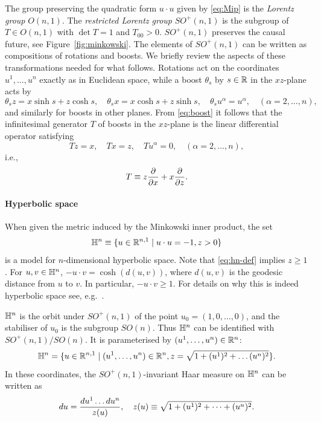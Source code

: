 \documentclass[11pt,a4paper]{article}
\begin{document}
The group preserving the quadratic form $u\cdot u$ given by
\eqref{eq:Mip} is the \emph{Lorentz group} $O(n,1)$.  The
\emph{restricted Lorentz group} $SO^+(n,1)$ is the subgroup of
$T \in O(n,1)$ with $\det T = 1$ and $T_{00} >0$.  $SO^{+}(n,1)$
preserves the causal future, see Figure~\ref{fig:minkowski}.  The
elements of $SO^+(n,1)$ can be written as compositions of
rotations and boosts. We briefly review the aspects of
these transformations needed for what follows. Rotations act on the
coordinates $u^{1},\dots, u^{n}$ exactly as in Euclidean space, while
a boost $\theta_{s}$ by $s\in\mathbb{R}$ in the $xz$-plane acts by
\begin{equation}
  \label{eq:boost}
  \theta_{s}z = x\sinh s + z \cosh s,
  \quad
  \theta_{s}x = x\cosh s + z \sinh s,
  \quad
  \theta_{s}u^{\alpha} = u^{\alpha}, \quad (\alpha=2,\dots, n),
\end{equation}
and similarly for boosts in other planes. From \eqref{eq:boost} it
follows that the infinitesimal generator $T$ of boosts in the
$xz$-plane is the linear differential operator satisfying
\begin{equation}
  \label{eq:boost-inf}
  T z = x, \quad T x = z, \quad T u^{\alpha} =0, \quad (\alpha=2,\dots, n),
\end{equation}
i.e.,
\begin{equation}
  T \equiv z \frac{\partial }{\partial x}+ x\frac{\partial }{\partial z}.
\end{equation}


\paragraph{Hyperbolic space}

When given the metric induced by the Minkowski inner product,
the set
\begin{equation}
  \label{eq:hn-def}
  \mathbb{H}^n \equiv \{ u \in \mathbb{R}^{n,1}
  \mid u \cdot u = -1, z >0\}
\end{equation}
is a model for $n$-dimensional hyperbolic space.  Note that
\eqref{eq:hn-def} implies $z\geq 1$. For $u,v\in\mathbb{H}^{n}$,
$-u\cdot v = \cosh (d(u,v))$, where $d(u,v)$ is the geodesic distance
from $u$ to $v$. In particular, $-u\cdot v \geq 1$. For details on why
this is indeed hyperbolic space see, e.g.~\cite{MR1491098}.

$\mathbb{H}^n$ is the orbit under $SO^+(n,1)$ of the point
 $u_0 = (1,0,\dots,0)$, and the stabiliser of $u_0$ is the subgroup
$SO(n)$.  Thus $\mathbb{H}^{n}$ can be identified with $SO^{+}(n,1)/ SO(n)$.
It is parameterised by $(u^{1},\dots, u^{n}) \in \mathbb{R}^n$:
\begin{equation}
  \label{eq:hyp-coord}
  \mathbb{H}^n = \{ u\in \mathbb{R}^{n,1}
  \mid (u^{1},\dots, u^{n})\in\mathbb{R}^{n},
  z=\sqrt{1+(u^{1})^{2} + \dots (u^{n})^{2}}\}.
\end{equation}
In these coordinates, the $SO^+(n,1)$-invariant Haar measure on
$\mathbb{H}^n$ can be written as
\begin{equation}
  \label{eq:hn-meas}
  du = \frac{du^{1}\dots du^{n}}{z(u)},
  \quad z(u) \equiv \sqrt{1+(u^1)^2 + \cdots + (u^n)^2}.
\end{equation}
\end{document}
